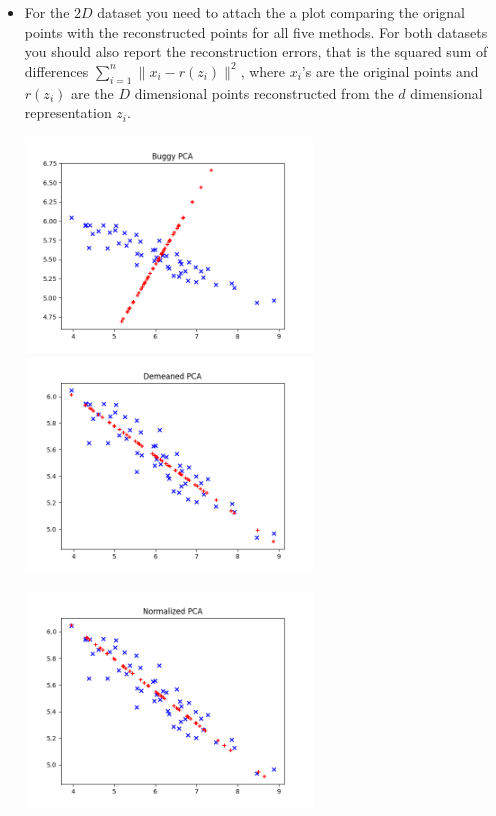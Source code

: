 \begin{itemize}
\item
For the $2D$ dataset you need to attach the a 
plot comparing the orignal points with the reconstructed points for all five
methods.
For both datasets you should also report the reconstruction errors, that is the squared sum of
differences $\sum_{i=1}^n \|x_i - r(z_i)\|^2$,
where $x_i$'s are the original points and $r(z_i)$ are the $D$ dimensional points
reconstructed from the 
$d$ dimensional representation $z_i$.

\begin{soln}

  \includegraphics[width=3in]{../figs/buggy_pca.png} \hspace{0.1in}
  \includegraphics[width=3in]{../figs/demeaned_pca.png} \\
  \begin{center}
    \includegraphics[width=3in]{../figs/normalized_pca.png}

\end{center}
\end{soln}
\end{itemize}
